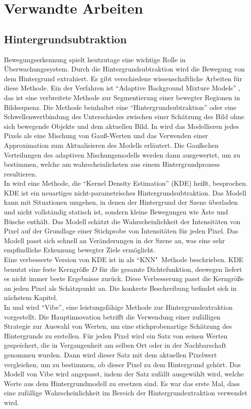 \section{Verwandte Arbeiten}
\subsection{Hintergrundsubtraktion}
Bewegungserkennung spielt heutzutage eine wichtige Rolle in Überwachungssystem. Durch die Hintergrundsubtraktion wird die Bewegung von dem Hintergrund extrahiert. Es gibt verschiedene wissenschaftliche Arbeiten für diese Methode. Ein der Verfahren ist ``Adaptive Background Mixture Models'' \cite{784637}, das ist eine verbreitete Methode zur Segmentierung einer bewegter Regionen in Bildsequenz. Die Methode beinhaltet eine ``Hintergrundsubtraktion'' oder eine Schwellenwertbindung des Unterschiedes zwischen einer Schätzung des Bild ohne sich bewegende Objekte und dem aktuellen Bild. In \cite{784637} wird das Modellieren jedes Pixels als eine Mischung von Gauß-Werten und das Verwenden einer Approximation zum Aktualisieren des Modells erläutert. Die Gaußschen Verteilungen des adaptiven Mischungsmodells werden dann ausgewertet, um zu bestimmen, welche am wahrscheinlichsten aus einem Hintergrundprozess resultieren.
\\
In \cite{elgammal2000non} wird eine Methode, die ``Kernel Density Estimation'' (\acs{KDE}) heißt, besprochen. \acs{KDE} ist ein neuartiges nicht-parametrisches Hintergrundsubtraktion. Das Modell kann mit Situationen umgehen, in denen der Hintergrund der Szene überladen und nicht vollständig statisch ist, sondern kleine Bewegungen wie Äste und Büsche enthält. Das Modell schätzt die Wahrscheinlichkeit der Intensitäten von Pixel auf der Grundlage einer Stichprobe von Intensitäten für jeden Pixel. Das Modell passt sich schnell an Veränderungen in der Szene an, was eine sehr empfindliche Erkennung bewegter Ziele ermöglicht.
\\
Eine verbesserte Version von \acs{KDE} ist in \cite{zivkovic2006efficient} als ``KNN"\ Methode beschrieben. \acs{KDE} benutzt eine feste Kerngröße $D$ für die gesamte Dichtefunktion, deswegen liefert es nicht immer beste Ergebnisse zurück. Diese Verbesserung passt die Kerngröße an jeden Pixel als Schätzpunkt an. Die konkrete Beschreibung befindet sich in nächstem Kapitel.
\\
In \cite{barnich2009vibe} und \cite{barnich2011vibe} wird ``Vibe'', eine leistungsfähige Methode zur Hintergrundextraktion vorgestellt. Die Hauptinnovation betrifft die Verwendung einer zufälligen Strategie zur Auswahl von Werten, um eine stichprobenartige Schätzung des Hintergrunds zu erstellen. Für jeden Pixel wird ein Satz von seinen Werten gespeichert, die in Vergangenheit am selben Ort oder in der Nachbarschaft genommen wurden. Dann wird dieser Satz mit dem aktuellen Pixelwert vergleichen, um zu bestimmen, ob dieser Pixel zu dem Hintergrund gehört. Das Modell von Vibe wird angepasst, indem der Satz zufällt ausgewählt wird, welche Werte aus dem Hintergrundmodell zu ersetzen sind. Es war das erste Mal, dass eine zufällige Wahrscheinlichkeit im Bereich der Hintergrundextraktion verwendet wird.
